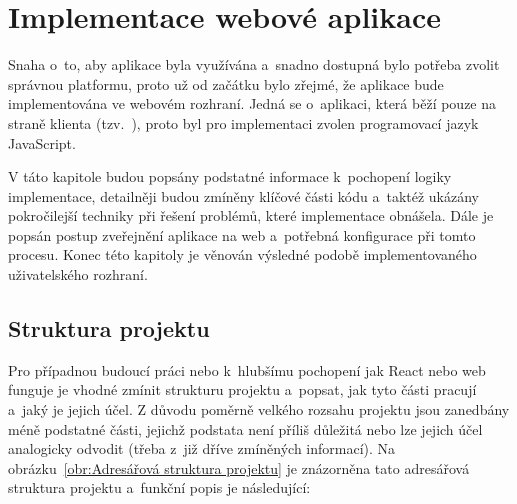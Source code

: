 \chapter{Implementace webové aplikace}
\label{chap:Implementace webové aplikace}
Snaha o~to, aby aplikace byla využívána a~snadno dostupná bylo potřeba zvolit správnou platformu, proto už od začátku bylo zřejmé, že aplikace bude implementována ve webovém rozhraní. Jedná se o~aplikaci, která běží pouze na straně klienta (tzv.~), proto byl pro implementaci zvolen programovací jazyk JavaScript.

V táto kapitole budou popsány podstatné informace k~pochopení logiky implementace, detailněji budou zmíněny klíčové části kódu a~taktéž ukázány pokročilejší techniky při řešení problémů, které implementace obnášela. Dále je popsán postup zveřejnění aplikace na web a~potřebná konfigurace při tomto procesu. Konec této kapitoly je věnován výsledné podobě implementovaného uživatelského rozhraní.

\section{Struktura projektu}
\label{sec:Struktura projektu}
Pro případnou budoucí práci nebo k~hlubšímu pochopení jak React nebo web funguje je vhodné zmínit strukturu projektu a~popsat, jak tyto části pracují a~jaký je jejich účel. Z důvodu poměrně velkého rozsahu projektu jsou zanedbány méně podstatné části, jejichž podstata není příliš důležitá nebo lze jejich účel analogicky odvodit (třeba z~již dříve zmíněných informací). Na obrázku~\ref{obr:Adresářová struktura projektu} je znázorněna tato adresářová struktura projektu a~funkční popis je následující:

